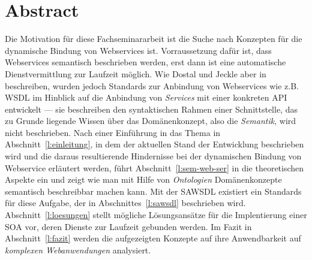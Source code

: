 \section*{Abstract}

Die Motivation für diese Fachseminararbeit ist die Suche nach Konzepten für die dynamische Bindung von Webservices ist. Vorraussetzung dafür ist, dass Webservices semantisch beschrieben werden, erst dann ist eine automatische Dienstvermittlung zur Laufzeit möglich. Wie Dostal und Jeckle aber in \cite[S.55]{xmlspek1} beschreiben, wurden jedoch Standards zur Anbindung von Webservices wie z.B. \acs{WSDL} im Hinblick auf die Anbindung von \emph{Services} mit einer konkreten \acs{API} entwickelt --- sie beschreiben den syntaktischen Rahmen einer Schnittstelle, das zu Grunde liegende Wissen über das Domänenkonzept, also die \emph{Semantik}, wird nicht beschrieben. Nach einer Einführung in das Thema in Abschnitt~\ref{l:einleitung}, in dem der aktuellen Stand der Entwicklung beschrieben wird und die daraus resultierende Hindernisse bei der dynamischen Bindung von Webservice erläutert werden, führt Abschnitt~\ref{l:sem-web-ser} in die theoretischen Aspekte ein und zeigt wie man mit Hilfe von \emph{Ontologien} Domänenkonzepte semantisch beschreibbar machen kann. Mit der \acs{SAWSDL} existiert ein Standards für diese Aufgabe, der in Abschnittes~\ref{l:sawsdl} beschrieben wird. Abschnitt~\ref{l:loesungen} stellt mögliche Lösungsansätze für die Implentierung einer \acs{SOA} vor, deren Dienste zur Laufzeit gebunden werden. Im Fazit in Abschnitt~\ref{l:fazit} werden die aufgezeigten Konzepte auf ihre Anwendbarkeit auf \emph{komplexen Webanwendungen} analysiert.